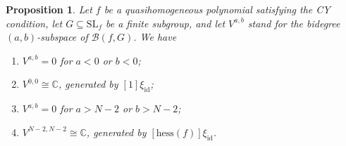 \documentclass[10pt,a4paper]{article}
\numberwithin{equation}{section}
\newtheorem{Proposition}[Theorem]{Proposition}
 { \theoremstyle{definition}
\newtheorem{Definition}[Theorem]{Definition}
\newtheorem{Note}[Theorem]{Note}
\newtheorem{Example}[Theorem]{Example}
\newtheorem{Remark}[Theorem]{Remark} }
\newcommand{\CC}{{\mathbb{C}}}
\newcommand{\SL}{{\mathrm{SL}}}
\newcommand{\id}{\mathrm{id}}
\newcommand{\hess}{\mathrm{hess}}
\def\B{{\mathcal B}}
\begin{document}
\begin{Proposition}\label{proposition: diamond under CY}
	Let $f$ be a quasihomogeneous polynomial satisfying the CY condition, let $G \subseteq \SL_f$ be a finite subgroup, and let $V^{a,b}$ stand for the bidegree $(a,b)$-subspace of $\B(f,G)$. We have
	\begin{enumerate}\itemsep=0pt
	 \item[$(i)$] $V^{a,b} = 0$ for $a < 0$ or $b < 0$;
	 \item[$(ii)$] $V^{0,0} \cong \CC$, generated by $[1]\xi_\id$;
	 \item[$(iii)$] $V^{a,b} = 0$ for $a > N-2$ or $b > N-2$;
	 \item[$(iv)$] $V^{N-2,N-2} \cong \CC$, generated by $[\hess(f)]\xi_\id$.
	\end{enumerate}

\end{Proposition}
\end{document}
